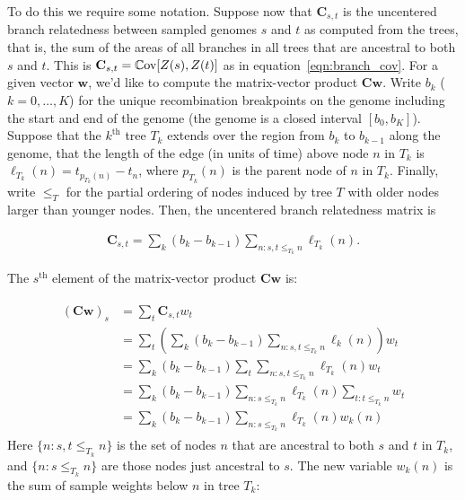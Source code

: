 To do this we require some notation.
Suppose now that $\mathbf{C}_{s,t}$ is the uncentered branch relatedness between
sampled genomes $s$ and $t$ as computed from the trees, that is,
the sum of the areas of all branches in all trees that are ancestral to both $s$ and $t$.
This is $\mathbf{C}_{s,t} = \mathbb{C}\text{ov}[Z(s), Z(t)]$ as in equation~\eqref{eqn:branch_cov}.
For a given vector $\mathbf{w}$, we'd like to compute the matrix-vector product $\mathbf{C}\mathbf{w}$.
Write $b_k$ ($k=0,\ldots,K$) for the unique recombination breakpoints on the genome
including the start and end of the genome (the genome is a closed interval $[b_0, b_K]$).
Suppose that the $k^{\text{th}}$ tree $T_k$ extends over the region from $b_k$ to $b_{k-1}$ along the genome,
that the length of the edge (in units of time) above node $n$ in $T_k$ is
$\ell_{T_k}(n) = t_{p_{T_k}(n)}-t_n$,
where $p_{T_k}(n)$ is the parent node of $n$ in $T_k$.
Finally, write $\le_T$ 
for the partial ordering of nodes induced by tree $T$
with older nodes larger than younger nodes.
Then, the uncentered branch relatedness matrix is

\begin{align} \label{defn:pairwise_relatedness}
    \mathbf{C}_{s,t} = \sum_k (b_k - b_{k-1}) \sum_{n: s,t \le_{T_k} n} \ell_{T_k}(n) .
\end{align}

The $s^{\text{th}}$ element of the matrix-vector product $\mathbf{C}\mathbf{w}$ is:

\begin{align} \label{eq:similar_ralph2020}
    \begin{aligned}
        (\mathbf{C}\mathbf{w})_s &=
        \sum_t \mathbf{C}_{s,t} w_t \\
        &=
        \sum_t
        \left(
            \sum_k (b_k - b_{k-1}) \sum_{n: s,t \le_{T_k} n} \ell_k(n)
        \right) {w}_t \\
        &=
        \sum_k (b_k - b_{k-1})
        \sum_t
        \sum_{n: s,t \le_{T_k} n} \ell_{T_k}(n) {w}_t \\
        &=
        \sum_k (b_k - b_{k-1})
        \sum_{n: s\le_{T_k} n} \ell_{T_k}(n)
        \sum_{t:t \le_{T_k} n} {w}_t \\
        &=
        \sum_k (b_k - b_{k-1})
        \sum_{n: s\le_{T_k} n} \ell_{T_k}(n) w_k(n)
    \end{aligned}
\end{align}
Here 
$\{n : s,t \le_{T_k} n\}$ is the set of nodes $n$ that are ancestral to both $s$ and $t$ in $T_k$,
and $\{n : s \le_{T_k} n\}$ are those nodes just ancestral to $s$.
The new variable $w_k(n)$ is the sum of sample weights below $n$ in tree $T_k$:

